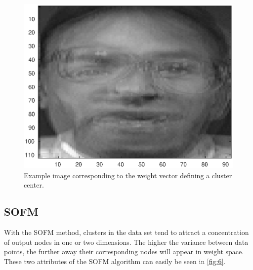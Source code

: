 \documentclass[a4paper,12pt]{article}
\theoremstyle{plain}
\theoremstyle{definition}
\begin{document}
      \begin{figure}[H]
         \centering
         \includegraphics[scale=.6]{45avg}
         \caption{Example image corresponding to the weight vector defining
         a cluster center.}
         \label{fig:45avg}
      \end{figure}

      \subsection{SOFM}

      With the SOFM method, clusters in the data set tend to attract a concentration of
      output nodes in one or two dimensions. The higher the variance between
      data points, the further away their corresponding nodes will appear in
      weight space. These two attributes of the SOFM algorithm can easily be
      seen in \cref{fig:6}.
      
\end{document}
